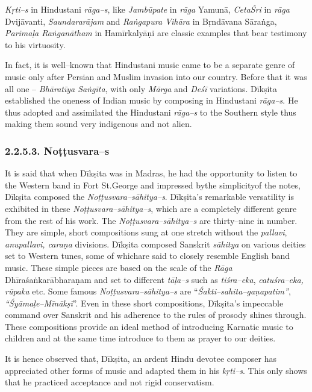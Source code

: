 \textit{Kṛti–s} in Hindustani \textit{rāga–s}, like \textit{Jambūpate} in \textit{rāga} Yamunā, \textit{CetaŚri} in \textit{rāga} Dvijāvanti, \textit{Saundararājam} and \textit{Raṅgapura Vihāra} in Bṛndāvana Sāraṅga, \textit{Parimaḷa Raṅganātham} in Hamīrkalyāṇi are classic examples that bear testimony to his virtuosity.

In fact, it is well–known that Hindustani music came to be a separate genre of music only after Persian and Muslim invasion into our country. Before that it was all one – \textit{Bhāratīya Saṅgīta}, with only \textit{Mārga} and \textit{Deśī} variations. Dīkṣita established the oneness of Indian music by composing in Hindustani \textit{rāga–s}. He thus adopted and assimilated the Hindustani \textit{rāga–s} to the Southern style thus making them sound very indigenous and not alien.


\subsubsection*{2.2.5.3. Noṭṭusvara–s}

It is said that when Dīkṣita was in Madras, he had the opportunity to listen to the Western band in Fort St.George and impressed bythe simplicityof the notes, Dīkṣita composed the \textit{Noṭṭusvara–sāhitya–s}. Dīkṣita's remarkable versatility is exhibited in these \textit{Noṭṭusvara–sāhitya–s}, which are a completely different genre from the rest of his work. The \textit{Noṭṭusvara–sāhitya–s} are thirty–nine in number. They are simple, short compositions sung at one stretch without the \textit{pallavi}, \textit{anupallavi, caraṇa} divisions. Dīkṣita composed Sanskrit \textit{sāhitya} on various deities set to Western tunes, some of whichare said to closely resemble English band music. These simple pieces are based on the scale of the \textit{Rāga} Dhīraśaṅkarābharaṇam and set to different \textit{tāḷa–s} such as \textit{tiśra–eka}, \textit{catuśra–eka, rūpaka} etc. Some famous \textit{Noṭṭusvara–sāhitya–s} are “\textit{Śakti–sahita–gaṇapatim”}, \textit{“Śyāmaḷe–Mīnākṣī}”. Even in these short compositions, Dīkṣita's impeccable command over Sanskrit and his adherence to the rules of prosody shines through. These compositions provide an ideal method of introducing Karnatic music to children and at the same time introduce to them as prayer to our deities.

It is hence observed that, Dīkṣita, an ardent Hindu devotee composer has appreciated other forms of music and adapted them in his \textit{kṛti–s}. This only shows that he practiced acceptance and not rigid conservatism.

